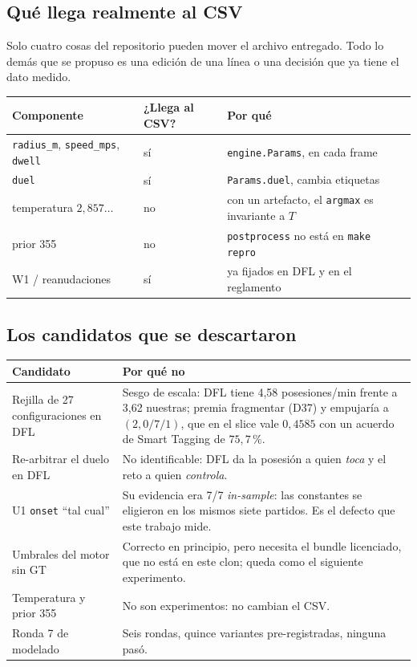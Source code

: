 \documentclass[11pt,a4paper]{article}
\begin{document}
\subsection*{Qué llega realmente al CSV}

Solo cuatro cosas del repositorio pueden mover el archivo entregado. Todo lo demás que se
propuso es una edición de una línea o una decisión que ya tiene el dato medido.

\begin{center}
\begin{tabular}{@{}p{4.1cm}p{2.3cm}p{7.2cm}@{}}
\hline
Componente & ¿Llega al CSV? & Por qué \\
\hline
\texttt{radius\_m}, \texttt{speed\_mps}, \texttt{dwell} & sí & \texttt{engine.Params}, en cada frame \\
\texttt{duel} & sí & \texttt{Params.duel}, cambia etiquetas \\
temperatura $2{,}857\ldots$ & no & con un artefacto, el \texttt{argmax} es invariante a $T$ \\
prior 355 & no & \texttt{postprocess} no está en \texttt{make repro} \\
W1 / reanudaciones & sí & ya fijados en DFL y en el reglamento \\
\hline
\end{tabular}
\end{center}

\subsection*{Los candidatos que se descartaron}

\begin{center}
\begin{tabular}{@{}p{4.6cm}p{10.2cm}@{}}
\hline
Candidato & Por qué no \\
\hline
Rejilla de 27 configuraciones en DFL & Sesgo de escala: DFL tiene 4,58 posesiones/min frente a
3,62 nuestras; premia fragmentar (D37) y empujaría a $(2{,}0/7/1)$, que en el slice vale
$0{,}4585$ con un acuerdo de Smart Tagging de $75{,}7\,\%$. \\
Re-arbitrar el duelo en DFL & No identificable: DFL da la posesión a quien \emph{toca} y el reto
a quien \emph{controla}. \\
U1 \texttt{onset} ``tal cual'' & Su evidencia era 7/7 \emph{in-sample}: las constantes se
eligieron en los mismos siete partidos. Es el defecto que este trabajo mide. \\
Umbrales del motor sin GT & Correcto en principio, pero necesita el bundle licenciado, que no
está en este clon; queda como el siguiente experimento. \\
Temperatura y prior 355 & No son experimentos: no cambian el CSV. \\
Ronda 7 de modelado & Seis rondas, quince variantes pre-registradas, ninguna pasó. \\
\hline
\end{tabular}
\end{center}
\end{document}
